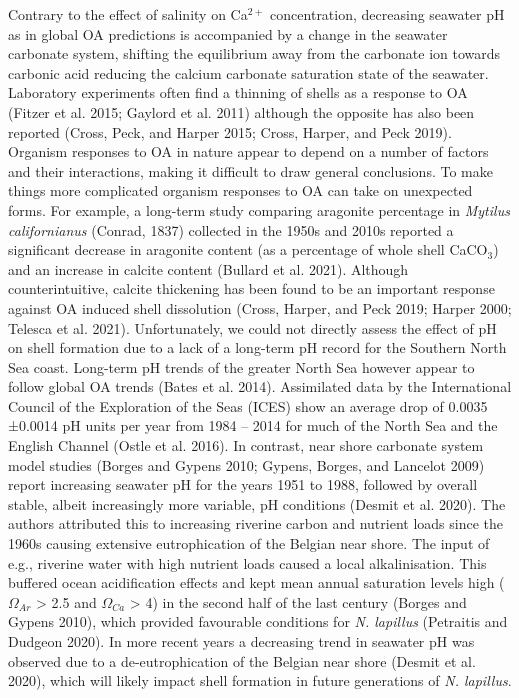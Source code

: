 \documentclass[smallextended]{svjour3}       %
\begin{document}
Contrary to the effect of salinity on Ca\(^{2+}\) concentration,
decreasing seawater pH as in global OA predictions is accompanied by a
change in the seawater carbonate system, shifting the equilibrium away
from the carbonate ion towards carbonic acid reducing the calcium
carbonate saturation state of the seawater. Laboratory experiments often
find a thinning of shells as a response to OA (Fitzer et al. 2015;
Gaylord et al. 2011) although the opposite has also been reported
(Cross, Peck, and Harper 2015; Cross, Harper, and Peck 2019). Organism
responses to OA in nature appear to depend on a number of factors and
their interactions, making it difficult to draw general conclusions. To
make things more complicated organism responses to OA can take on
unexpected forms. For example, a long-term study comparing aragonite
percentage in \emph{Mytilus californianus} (Conrad, 1837) collected in
the 1950s and 2010s reported a significant decrease in aragonite content
(as a percentage of whole shell CaCO\(_3\)) and an increase in calcite
content (Bullard et al. 2021). Although counterintuitive, calcite
thickening has been found to be an important response against OA induced
shell dissolution (Cross, Harper, and Peck 2019; Harper 2000; Telesca et
al. 2021). Unfortunately, we could not directly assess the effect of pH
on shell formation due to a lack of a long-term pH record for the
Southern North Sea coast. Long-term pH trends of the greater North Sea
however appear to follow global OA trends (Bates et al. 2014).
Assimilated data by the International Council of the Exploration of the
Seas (ICES) show an average drop of 0.0035 ±0.0014 pH units per year
from 1984 -- 2014 for much of the North Sea and the English Channel
(Ostle et al. 2016). In contrast, near shore carbonate system model
studies (Borges and Gypens 2010; Gypens, Borges, and Lancelot 2009)
report increasing seawater pH for the years 1951 to 1988, followed by
overall stable, albeit increasingly more variable, pH conditions (Desmit
et al. 2020). The authors attributed this to increasing riverine carbon
and nutrient loads since the 1960s causing extensive eutrophication of
the Belgian near shore. The input of e.g., riverine water with high
nutrient loads caused a local alkalinisation. This buffered ocean
acidification effects and kept mean annual saturation levels high
(\(\Omega_{Ar}\) \textgreater{} 2.5 and \(\Omega_{Ca}\) \textgreater{}
4) in the second half of the last century (Borges and Gypens 2010),
which provided favourable conditions for \emph{N. lapillus} (Petraitis
and Dudgeon 2020). In more recent years a decreasing trend in seawater
pH was observed due to a de-eutrophication of the Belgian near shore
(Desmit et al. 2020), which will likely impact shell formation in future
generations of \emph{N. lapillus}.
\end{document}
